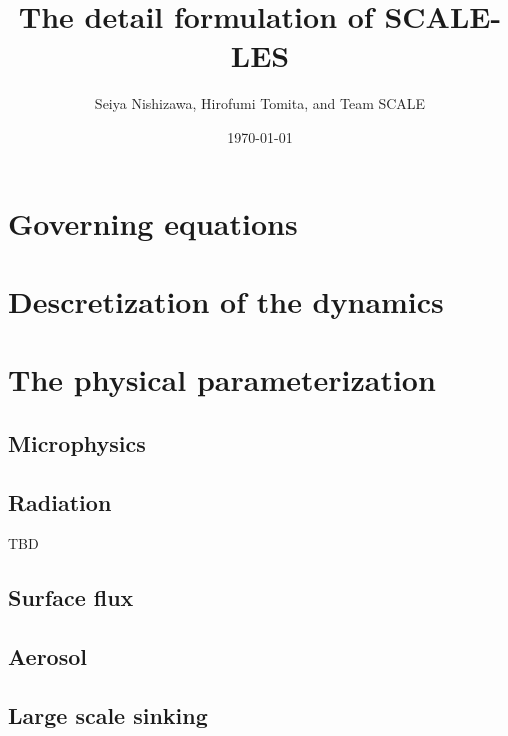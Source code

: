\documentclass[a4paper]{report}
\title{{\LARGE The detail formulation of SCALE-LES}}
\author{Seiya Nishizawa, Hirofumi Tomita, and Team SCALE}
\date{\today}
\begin{document}
\maketitle
\tableofcontents




\chapter{Governing equations}


\chapter{Descretization of the dynamics}
\label{chap:descretization dynamics}














\chapter{The physical parameterization}



\section{Microphysics}


\section{Radiation}
{\Huge TBD}

\section{Surface flux}


\section{Aerosol}


\section{Large scale sinking}





\appendix






\end{document}
